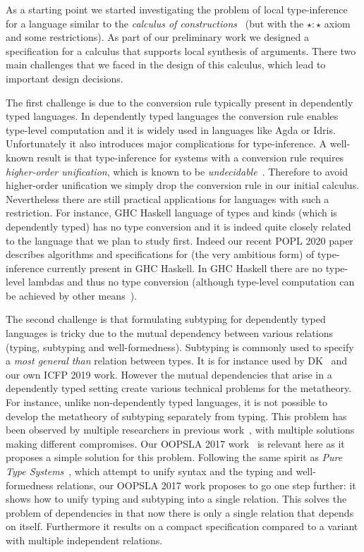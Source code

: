 As a starting point we started investigating the problem of local
type-inference for a language similar to the \emph{calculus of
  constructions}~\cite{Coquand:Huet} (but with the $\star : \star$ axiom and
some restrictions). As part of our preliminary work we designed a
specification for a calculus that supports local synthesis of arguments.
There two main challenges that we faced in the design of this calculus,
which lead to important design decisions.

The first challenge is due to the conversion rule typically present in
dependently typed languages. %
In dependently typed languages the conversion rule enables type-level
computation and it is widely used in languages like Agda or
Idris. Unfortunately it also introduces major complications for
type-inference. A well-known result is that type-inference for systems
with a conversion rule requires \emph{higher-order
  unification}, which is known to be \emph{undecidable}~\cite{goldfarb1981undecidability}.
Therefore to avoid higher-order unification we simply drop
the conversion rule in our initial calculus.
Nevertheless there are still practical applications for languages
with such a restriction. For instance, GHC Haskell language of types and kinds
(which is dependently typed) has no type conversion and it is indeed quite
closely related to the language that we plan to study first. Indeed
our recent POPL 2020 paper~\cite{xie20kind} describes algorithms and specifications
for (the very ambitious form) of type-inference currently present in GHC Haskell.
In GHC Haskell there are no type-level lambdas and thus no type conversion
(although type-level computation can be achieved by other means~\cite{Chakravarty05associated}).

The second challenge is that formulating subtyping for dependently typed
languages is tricky due to the mutual dependency between various relations
(typing, subtyping and well-formedness). Subtyping is commonly used to
specify a \emph{most general than} relation between types. It
is for instance used by DK~\cite{dunfield2013complete} and our own ICFP 2019 work. 
However the mutual dependencies that arise in a dependently typed setting create
various technical problems for the metatheory.
For instance, unlike non-dependently typed languages, it is
not possible to develop the metatheory of subtyping separately from typing. 
This problem has been observed by multiple researchers 
in previous work~\cite{subdep,Chen03coc,hutchins,ptssub}, with multiple solutions making different compromises.
Our OOPSLA 2017 work~\cite{full} is relevant here as it proposes a simple
solution for this problem. Following the same spirit as \emph{Pure Type Systems}~\cite{BarendregtHP:intgts},
which attempt to unify syntax and the typing and well-formedness relations,
our OOPSLA 2017 work proposes to go one step further: it shows how to unify typing
and subtyping into a single relation. This solves the problem of dependencies
in that now there is only a single relation that depends on itself. Furthermore
it results on a compact specification compared to a variant with multiple
independent relations.


